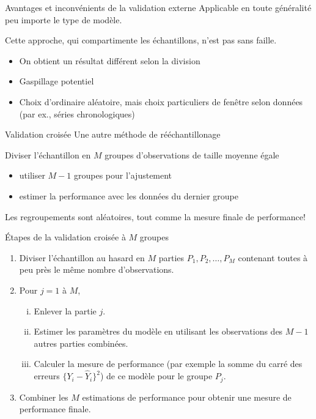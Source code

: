 \documentclass[
  ignorenonframetext,
]{beamer}
\providecommand{\tightlist}{%
  \setlength{\itemsep}{0pt}\setlength{\parskip}{0pt}}\usepackage{longtable,booktabs,array}
\begin{document}
\begin{frame}{Avantages et inconvénients de la validation externe}
\label{avantages-et-inconvuxe9nients-de-la-validation-externe}
Applicable en toute généralité peu importe le type de modèle.

Cette approche, qui compartimente les échantillons, n'est pas sans
faille.

\begin{itemize}
\tightlist
\item
  On obtient un résultat différent selon la division
\item
  Gaspillage potentiel
\item
  Choix d'ordinaire aléatoire, mais choix particuliers de fenêtre selon
  données (par ex., séries chronologiques)
\end{itemize}
\end{frame}

\begin{frame}{Validation croisée}
\label{validation-croisuxe9e}
Une autre méthode de rééchantillonage

Diviser l'échantillon en \(M\) groupes d'observations de taille moyenne
égale

\begin{itemize}
\tightlist
\item
  utiliser \(M-1\) groupes pour l'ajustement
\item
  estimer la performance avec les données du dernier groupe
\end{itemize}

Les regroupements sont aléatoires, tout comme la mesure finale de
performance!
\end{frame}

\begin{frame}{Étapes de la validation croisée à \(M\) groupes}
\label{uxe9tapes-de-la-validation-croisuxe9e-uxe0-m-groupes}
\begin{enumerate}
\tightlist
\item
  Diviser l'échantillon au hasard en \(M\) parties
  \(P_1, P_2, \ldots, P_M\) contenant toutes à peu près le même nombre
  d'observations.
\item
  Pour \(j = 1\) à \(M\),

  \begin{enumerate}
  [i.]
  \tightlist
  \item
    Enlever la partie \(j\).
  \item
    Estimer les paramètres du modèle en utilisant les observations des
    \(M-1\) autres parties combinées.
  \item
    Calculer la mesure de performance (par exemple la somme du carré des
    erreurs \(\{Y_i - \widehat{Y}_i\}^2\)) de ce modèle pour le groupe
    \(P_j\).
  \end{enumerate}
\item
  Combiner les \(M\) estimations de performance pour obtenir une mesure
  de performance finale.
\end{enumerate}
\end{frame}
\end{document}
